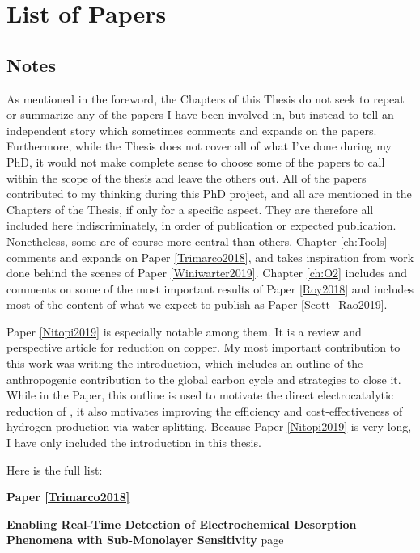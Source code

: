 \section*{List of Papers}

\subsection*{Notes}
As mentioned in the foreword, the Chapters of this Thesis do not seek to repeat or summarize any of the papers I have been involved in, but instead to tell an independent story which sometimes comments and expands on the papers. Furthermore, while the Thesis does not cover all of what I've done during my PhD, it would not make complete sense to choose some of the papers to call within the scope of the thesis and leave the others out. All of the papers contributed to my thinking during this PhD project, and all are mentioned in the Chapters of the Thesis, if only for a specific aspect. They are therefore all included here indiscriminately, in order of publication or expected publication. Nonetheless, some are of course more central than others. Chapter \ref{ch:Tools} comments and expands on Paper \ref{Trimarco2018}, and takes inspiration from work done behind the scenes of Paper \ref{Winiwarter2019}. Chapter \ref{ch:O2} includes and comments on some of the most important results of Paper \ref{Roy2018} and includes most of the content of what we expect to publish as Paper \ref{Scott_Rao2019}. 

Paper \ref{Nitopi2019} is especially notable among them. It is a review and perspective article for  reduction on copper. My most important contribution to this work was writing the introduction, which includes an outline of the anthropogenic contribution to the global carbon cycle and strategies to close it. While in the Paper, this outline is used to motivate the direct electrocatalytic reduction of , it also motivates improving the efficiency and cost-effectiveness of hydrogen production via water splitting. Because Paper \ref{Nitopi2019} is very long, I have only included the introduction in this thesis.

Here is the full list:
\vspace{10mm}
\parindent=0pt

\noindent\textbf{Paper \ref{Trimarco2018}} 

\textbf{Enabling Real-Time Detection of Electrochemical Desorption Phenomena with Sub-Monolayer Sensitivity} \hfill page~\pageref{Trimarco2018}

